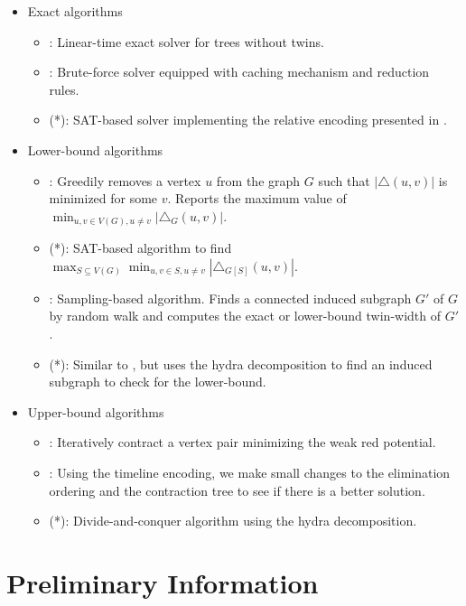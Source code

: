 \documentclass[a4paper,UKenglish,cleveref, autoref, thm-restate]{lipics-v2021}
\begin{document}
\begin{itemize}
	\item Exact algorithms
	\begin{itemize}
		\item \primetreesolver : Linear-time exact solver for trees without twins.
		\item \branchsolver : Brute-force solver equipped with caching mechanism and reduction rules.
		\item \directsolver (*): SAT-based solver implementing the relative encoding presented in \cite{schidler_sat_2021}.
	\end{itemize}
	\item Lower-bound algorithms
	\begin{itemize}
		\item \lbgreedy : Greedily removes a vertex $u$ from the graph $G$
		such that $|\triangle(u,v)|$ is minimized for some $v$.
		Reports the maximum value of $\displaystyle \min_{u,v \in V(G), u \neq v} |\triangle_{G} (u,v)|$.
		\item \lbcore (*): SAT-based algorithm to find 
		$\displaystyle \max_{S \subseteq V(G)} \min_{u,v \in S, u \neq v} |\triangle_{G[S]} (u,v)|$.
		\item \lbsample : Sampling-based algorithm.
		Finds a connected induced subgraph $G'$ of $G$
		by random walk and computes the exact or lower-bound twin-width of $G'$.
		\item \lbseparate (*): Similar to \lbsample, but uses the hydra decomposition to
		find an induced subgraph to check for the lower-bound.
	\end{itemize}
	\item Upper-bound algorithms
	\begin{itemize}
		\item \ubgreedy : Iteratively contract a vertex pair minimizing the weak red potential.
		\item \ublocalsearch : Using the timeline encoding, we make small changes to
		the elimination ordering and the contraction tree to see if there is a better solution.
		\item \ubseparate (*): Divide-and-conquer algorithm using the hydra decomposition.
	\end{itemize}
\end{itemize}

\section{Preliminary Information}
\label{sec:background}
\end{document}
